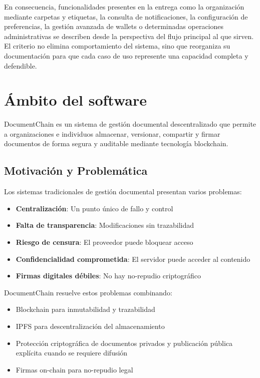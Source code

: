 \documentclass[11pt, a4paper]{article}
\begin{document}
En consecuencia, funcionalidades presentes en la entrega como la organización mediante carpetas y etiquetas, la consulta de notificaciones, la configuración de preferencias, la gestión avanzada de wallets o determinadas operaciones administrativas se describen desde la perspectiva del flujo principal al que sirven. El criterio no elimina comportamiento del sistema, sino que reorganiza su documentación para que cada caso de uso represente una capacidad completa y defendible.

\section{Ámbito del software}

DocumentChain es un sistema de gestión documental descentralizado que permite a organizaciones e individuos almacenar, versionar, compartir y firmar documentos de forma segura y auditable mediante tecnología blockchain.

\subsection{Motivación y Problemática}

Los sistemas tradicionales de gestión documental presentan varios problemas:

\begin{itemize}
    \item \textbf{Centralización}: Un punto único de fallo y control
    \item \textbf{Falta de transparencia}: Modificaciones sin trazabilidad
    \item \textbf{Riesgo de censura}: El proveedor puede bloquear acceso
    \item \textbf{Confidencialidad comprometida}: El servidor puede acceder al contenido
    \item \textbf{Firmas digitales débiles}: No hay no-repudio criptográfico
\end{itemize}

DocumentChain resuelve estos problemas combinando:

\begin{itemize}
    \item Blockchain para inmutabilidad y trazabilidad
    \item IPFS para descentralización del almacenamiento
    \item Protección criptográfica de documentos privados y publicación pública explícita cuando se requiere difusión
    \item Firmas on-chain para no-repudio legal
\end{itemize}
\end{document}

